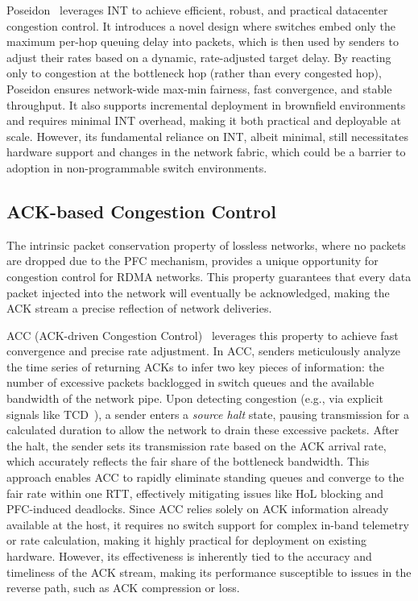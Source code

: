 \documentclass[11pt,en]{elegantpaper}
\begin{document}
Poseidon~\cite{poseidon} leverages INT to achieve efficient, robust, and practical datacenter congestion control. It introduces a novel design where switches embed only the maximum per-hop queuing delay into packets, which is then used by senders to adjust their rates based on a dynamic, rate-adjusted target delay. By reacting only to congestion at the bottleneck hop (rather than every congested hop), Poseidon ensures network-wide max-min fairness, fast convergence, and stable throughput. It also supports incremental deployment in brownfield environments and requires minimal INT overhead, making it both practical and deployable at scale. However, its fundamental reliance on INT, albeit minimal, still necessitates hardware support and changes in the network fabric, which could be a barrier to adoption in non-programmable switch environments.

\subsection{ACK-based Congestion Control}
\label{sec:ack-based}

The intrinsic packet conservation property of lossless networks, where no packets are dropped due to the PFC mechanism, provides a unique opportunity for congestion control for RDMA networks. This property guarantees that every data packet injected into the network will eventually be acknowledged, making the ACK stream a precise reflection of network deliveries.

ACC (ACK-driven Congestion Control)~\cite{acc} leverages this property to achieve fast convergence and precise rate adjustment. In ACC, senders meticulously analyze the time series of returning ACKs to infer two key pieces of information: the number of excessive packets backlogged in switch queues and the available bandwidth of the network pipe. Upon detecting congestion (e.g., via explicit signals like TCD~\cite{tcd}), a sender enters a \textit{source halt} state, pausing transmission for a calculated duration to allow the network to drain these excessive packets. After the halt, the sender sets its transmission rate based on the ACK arrival rate, which accurately reflects the fair share of the bottleneck bandwidth. This approach enables ACC to rapidly eliminate standing queues and converge to the fair rate within one RTT, effectively mitigating issues like HoL blocking and PFC-induced deadlocks. Since ACC relies solely on ACK information already available at the host, it requires no switch support for complex in-band telemetry or rate calculation, making it highly practical for deployment on existing hardware. However, its effectiveness is inherently tied to the accuracy and timeliness of the ACK stream, making its performance susceptible to issues in the reverse path, such as ACK compression or loss.
\end{document}
